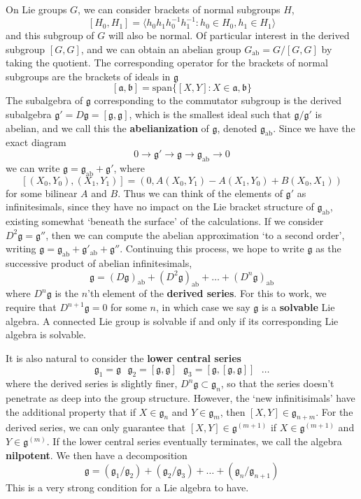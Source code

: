 On Lie groups $G$, we can consider brackets of normal subgroups $H$,
%
\[ [H_0,H_1] = \langle h_0h_1h_0^{-1}h_1^{-1} : h_0 \in H_0, h_1 \in H_1 \rangle \]
%
and this subgroup of $G$ will also be normal. Of particular interest in the derived subgroup $[G,G]$, and we can obtain an abelian group $G_{\text{ab}} = G/[G,G]$ by taking the quotient. The corresponding operator for the brackets of normal subgroups are the brackets of ideals in $\mathfrak{g}$
%
\[ [\mathfrak{a}, \mathfrak{b}] = \text{span} \{ [X,Y] : X \in \mathfrak{a}, \mathfrak{b} \} \]
%
The subalgebra of $\mathfrak{g}$ corresponding to the commutator subgroup is the derived subalgebra $\mathfrak{g}' = D\mathfrak{g} = [\mathfrak{g}, \mathfrak{g}]$, which is the smallest ideal such that $\mathfrak{g}/\mathfrak{g}'$ is abelian, and we call this the {\bf abelianization} of $\mathfrak{g}$, denoted $\mathfrak{g}_{\text{ab}}$. Since we have the exact diagram
%
\[ 0 \to \mathfrak{g}' \to \mathfrak{g} \to \mathfrak{g}_{\text{ab}} \to 0 \]
%
we can write $\mathfrak{g} = \mathfrak{g}_{\text{ab}} + \mathfrak{g}'$, where
%
\[ [(X_0,Y_0),(X_1,Y_1)] = (0, A(X_0,Y_1) - A(X_1,Y_0) + B(X_0,X_1)) \]
%
for some bilinear $A$ and $B$. Thus we can think of the elements of $\mathfrak{g}'$ as infinitesimals, since they have no impact on the Lie bracket structure of $\mathfrak{g}_{\text{ab}}$, existing somewhat `beneath the surface' of the calculations. If we consider $D^2 \mathfrak{g} = \mathfrak{g}''$, then we can compute the abelian approximation `to a second order', writing $\mathfrak{g} = \mathfrak{g}_{\text{ab}} + \mathfrak{g}'_{\text{ab}} + \mathfrak{g}''$. Continuing this process, we hope to write $\mathfrak{g}$ as the successive product of abelian infinitesimals,
%
\[ \mathfrak{g} = (D\mathfrak{g})_{\text{ab}} + (D^2 \mathfrak{g})_{\text{ab}} + \dots + (D^n \mathfrak{g})_{\text{ab}} \]
%
where $D^n \mathfrak{g}$ is the $n$'th element of the {\bf derived series}. For this to work, we require that $D^{n+1} \mathfrak{g} = 0$ for some $n$, in which case we say $\mathfrak{g}$ is a {\bf solvable} Lie algebra. A connected Lie group is solvable if and only if its corresponding Lie algebra is solvable.

It is also natural to consider the {\bf lower central series}
%
\[ \mathfrak{g}_1 = \mathfrak{g}\ \ \  \mathfrak{g}_2 = [\mathfrak{g}, \mathfrak{g}]\ \ \ \mathfrak{g}_3 = [\mathfrak{g}, [\mathfrak{g}, \mathfrak{g}]]\ \ \  \dots \]
%
where the derived series is slightly finer, $D^n \mathfrak{g} \subset \mathfrak{g}_n$, so that the series doesn't penetrate as deep into the group structure. However, the `new infinitisimals' have the additional property that if $X \in \mathfrak{g}_n$ and $Y \in \mathfrak{g}_m$, then $[X,Y] \in \mathfrak{g}_{n+m}$. For the derived series, we can only guarantee that $[X,Y] \in \mathfrak{g}^{(m+1)}$ if $X \in \mathfrak{g}^{(m+1)}$ and $Y \in \mathfrak{g}^{(m)}$. If the lower central series eventually terminates, we call the algebra {\bf nilpotent}. We then have a decomposition
%
\[ \mathfrak{g} = (\mathfrak{g}_1/\mathfrak{g}_2) + (\mathfrak{g}_2/\mathfrak{g}_3) + \dots + (\mathfrak{g}_n/\mathfrak{g}_{n+1}) \]
%
This is a very strong condition for a Lie algebra to have.

